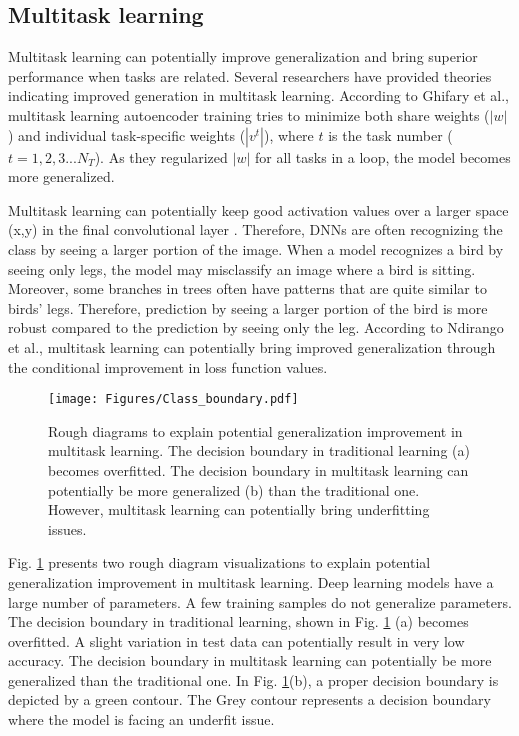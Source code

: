 \documentclass{article}
\begin{document}
\subsection{Multitask learning}
Multitask learning can potentially improve generalization and bring superior performance when tasks are related. Several researchers have provided theories indicating improved generation in multitask learning. According to Ghifary et al., \cite{ghifary2015domain} multitask learning autoencoder training tries to minimize both share weights ($|w|$) and individual task-specific weights ($|v^t|$), where $t$ is the task number ($t=1,2,3... N_T$). As they regularized $|w|$ for all tasks in a loop, the model becomes more generalized.

Multitask learning can potentially keep good activation values over a larger space (x,y) in the final convolutional layer \cite{kapidis2019multitask}. Therefore, DNNs are often recognizing the class by seeing a larger portion of the image. When a model recognizes a bird by seeing only legs, the model may misclassify an image where a bird is sitting. Moreover, some branches in trees often have patterns that are quite similar to birds' legs. Therefore, prediction by seeing a larger portion of the bird is more robust compared to the prediction by seeing only the leg.
According to Ndirango et al., \cite{ndirango2019generalization} multitask learning can potentially bring improved generalization through the conditional improvement in loss function values.




\begin{figure}[ht]
\vskip 0.2in
\begin{center}
\centerline{\texttt{[image: Figures/Class\_boundary.pdf]}}
\caption{Rough diagrams to explain potential generalization improvement in multitask learning.  The decision boundary in traditional learning (a) becomes overfitted. The decision boundary in multitask learning can potentially be more generalized (b) than the traditional one. However, multitask learning can potentially bring underfitting issues.}
\label{Cluster}
\end{center}
\vskip -0.2in
\end{figure}

Fig. \ref{Cluster} presents two rough diagram visualizations to explain potential generalization improvement in multitask learning. Deep learning models have a large number of parameters. A few training samples do not generalize parameters. The decision boundary in traditional learning, shown in Fig. \ref{Cluster} (a) becomes overfitted. A slight variation in test data can potentially result in very low accuracy. The decision boundary in multitask learning can potentially be more generalized than the traditional one. In Fig. \ref{Cluster}(b), a proper decision boundary is depicted by a green contour. The Grey contour represents a decision boundary where the model is facing an underfit issue.
 
\end{document}
